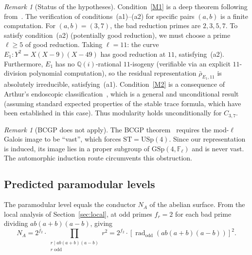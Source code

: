 \documentclass[11pt,a4paper]{article}
\newcommand{\rad}{\operatorname{rad}}
\newcommand{\GSp}{\mathrm{GSp}}
\newcommand{\USp}{\mathrm{USp}}
\theoremstyle{definition}
\theoremstyle{remark}
\newtheorem{remark}[theorem]{Remark}
\begin{document}
\begin{remark}[Status of the hypotheses]
  Condition~\ref{M1} is a deep theorem following from~\cite{Allen}.
  The verification of conditions~(a1)--(a2) for specific pairs
  $(a,b)$ is a finite computation.
  For $(a,b) = (3,7)$, the bad reduction primes are $2, 3, 5, 7$.
  To satisfy condition~(a2) (potentially good reduction), we must
  choose a prime $\ell \ge 5$ of good reduction.
  Taking $\ell = 11$: the curve $E_1\colon Y^2 = X(X-9)(X-49)$ has
  good reduction at $11$, satisfying~(a2).
  Furthermore, $E_1$ has no $\mathbb{Q}(i)$-rational $11$-isogeny
  (verifiable via an explicit $11$-division polynomial
  computation), so the residual representation $\bar{\rho}_{E_1, 11}$
  is absolutely irreducible, satisfying~(a1).
  Condition~\ref{M2} is a consequence of Arthur's endoscopic
  classification~\cite{Arthur}, which is a general and unconditional
  result (assuming standard expected properties of the stable
  trace formula, which have been established in this case).
  Thus modularity holds unconditionally for $C_{3,7}$.
\end{remark}

\begin{remark}[BCGP does not apply]\label{rem:BCGP}
  The BCGP theorem~\cite{BCGP} requires the mod-$\ell$
  Galois image to be ``vast'', which forces
  $\mathrm{ST} = \USp(4)$.
  Since our representation is induced, its image lies in a
  proper subgroup of $\GSp(4, \mathbb{F}_\ell)$ and is never
  vast.
  The automorphic induction route circumvents this obstruction.
\end{remark}

\subsection{Predicted paramodular levels}

The paramodular level equals the conductor $N_A$ of the
abelian surface.
From the local analysis of Section~\ref{sec:local}, at odd
primes $f_r = 2$ for each bad prime dividing $ab(a+b)(a-b)$,
giving
\[
  N_A = 2^{f_2} \cdot
  \prod_{\substack{r \mid ab(a+b)(a-b) \\ r \text{ odd}}} r^2
  = 2^{f_2} \cdot [\rad_{\mathrm{odd}}(ab(a+b)(a-b))]^2.
\]
\end{document}

